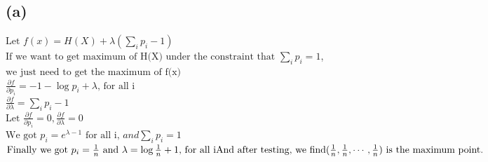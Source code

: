 \documentclass [11pt, a4paper, oneside] {article}
\begin{document}
\subsection *{(a)}
$\textrm{Let } f(x) = H(X) + \lambda(\sum_{i}p_i -1)$\\
$\textrm{If we want to get  maximum of H(X) under the constraint that }\sum_{i}p_i=1$,\\
$\textrm{we just need to get the maximum of f(x) }$\\
$\frac{\partial{f}}{\partial{p_i}} = -1-\log{p_i}+\lambda \textrm{, for all i}$\\
$\frac{\partial{f}}{\partial{\lambda}}= \sum_{i}p_i - 1 $\\
$\textrm{Let } \frac{\partial{f}}{\partial{p_i}} = 0, \frac{\partial{f}}{\partial{\lambda}} = 0$\\
$\textrm{We got } p_i = e^{\lambda-1} \textrm{ for all i, }and \sum_{i}p_i=1$\\
$\textrm{Finally we got } p_i = \frac{1}{n} \textrm{ and } \lambda = \log{\frac{1}{n}} + 1\textrm{, for all i}\\ \textrm{And after testing, we find}(\frac{1}{n},\frac{1}{n}, \cdots, \frac{1}{n})\textrm{ is the maximum point.}$\\
\end{document}

